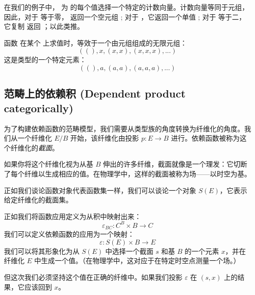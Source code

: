 \documentclass[DaoFP]{subfiles}
\begin{document}
  在我们的例子中， 为  的每个值选择一个特定的计数向量。计数向量等同于元组，因此，对于  等于零， 返回一个空元组 \hask{()}; 对于 ，它返回一个单值 ; 对于  等于二，它复制  返回 ；以此类推。

  函数  在某个  上求值时，等效于一个由元组组成的无限元组：
  \[ ((), x, (x, x), (x, x, x), ...) \]
  这是类型的一个特定元素：
  \[ ((), a, (a, a), (a, a, a), ...) \]

  \subsection{范畴上的依赖积 (Dependent product categorically)}
  为了构建依赖函数的范畴模型，我们需要从类型族的角度转换为纤维化的角度。我们从一个纤维化 $E/B$ 开始，该纤维化由投影 $p\colon E \to B$ 进行。依赖函数被称为这个纤维化的\emph{截面}。

  如果你将这个纤维化视为从基 $B$ 伸出的许多纤维，截面就像是一个理发：它切断了每个纤维以生成相应的值。在物理学中，这样的截面被称为场——以时空为基。

  正如我们谈论函数对象代表函数集一样，我们可以谈论一个对象 $S(E)$，它表示给定纤维化的截面集。

  正如我们将函数应用定义为从积中映射出来：
  \[\varepsilon_{B C} \colon C^B \times B \to C\]
  我们可以定义依赖函数的应用为一个映射：
  \[\varepsilon \colon S(E) \times B \to E\]
  我们可以将其形象化为从 $S(E)$ 中选择一个截面 $s$ 和基 $B$ 的一个元素 $x$，并在纤维化 $E$ 中生成一个值。（在物理学中，这对应于在特定时空点测量一个场。）

  但这次我们必须坚持这个值在正确的纤维中。如果我们投影 $\varepsilon$ 在 $(s, x)$ 上的结果，它应该回到 $x$。
\end{document}
